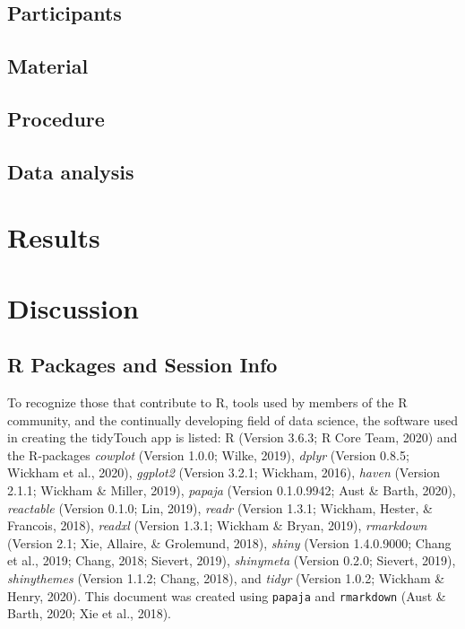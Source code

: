 \documentclass[english,man,floatsintext]{apa6}
\begin{document}
\hypertarget{participants}{%
\subsection{Participants}\label{participants}}

\hypertarget{material}{%
\subsection{Material}\label{material}}

\hypertarget{procedure}{%
\subsection{Procedure}\label{procedure}}

\hypertarget{data-analysis}{%
\subsection{Data analysis}\label{data-analysis}}

\hypertarget{results}{%
\section{Results}\label{results}}

\hypertarget{discussion}{%
\section{Discussion}\label{discussion}}

\hypertarget{r-packages-and-session-info}{%
\subsection{R Packages and Session Info}\label{r-packages-and-session-info}}

To recognize those that contribute to R, tools used by members of the R community, and the continually developing field of data science, the software used in creating the tidyTouch app is listed: R (Version 3.6.3; R Core Team, 2020) and the R-packages \emph{cowplot} (Version 1.0.0; Wilke, 2019), \emph{dplyr} (Version 0.8.5; Wickham et al., 2020), \emph{ggplot2} (Version 3.2.1; Wickham, 2016), \emph{haven} (Version 2.1.1; Wickham \& Miller, 2019), \emph{papaja} (Version 0.1.0.9942; Aust \& Barth, 2020), \emph{reactable} (Version 0.1.0; Lin, 2019), \emph{readr} (Version 1.3.1; Wickham, Hester, \& Francois, 2018), \emph{readxl} (Version 1.3.1; Wickham \& Bryan, 2019), \emph{rmarkdown} (Version 2.1; Xie, Allaire, \& Grolemund, 2018), \emph{shiny} (Version 1.4.0.9000; Chang et al., 2019; Chang, 2018; Sievert, 2019), \emph{shinymeta} (Version 0.2.0; Sievert, 2019), \emph{shinythemes} (Version 1.1.2; Chang, 2018), and \emph{tidyr} (Version 1.0.2; Wickham \& Henry, 2020). This document was created using \texttt{papaja} and \texttt{rmarkdown} (Aust \& Barth, 2020; Xie et al., 2018).
\end{document}
